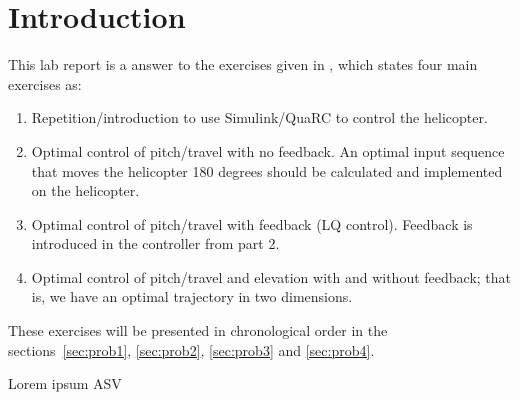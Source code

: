 \section{Introduction}
This lab report is a answer to the exercises given in \cite{labex},
which states four main exercises as:
\begin{enumerate}
\item Repetition/introduction to use Simulink/QuaRC to control the
helicopter.
\item Optimal control of pitch/travel with no feedback. An optimal
input sequence that moves the helicopter 180 degrees should be
calculated and implemented on the helicopter.
\item Optimal control of pitch/travel with feedback (LQ control).
Feedback is introduced in the controller from part 2.
\item Optimal control of pitch/travel and elevation with and without
feedback; that is, we have an optimal trajectory in two dimensions.
\end{enumerate}
These exercises will be presented in chronological order in the
sections~\ref{sec:prob1}, \ref{sec:prob2}, \ref{sec:prob3} and
\ref{sec:prob4}.

Lorem ipsum \acl{ASV}
